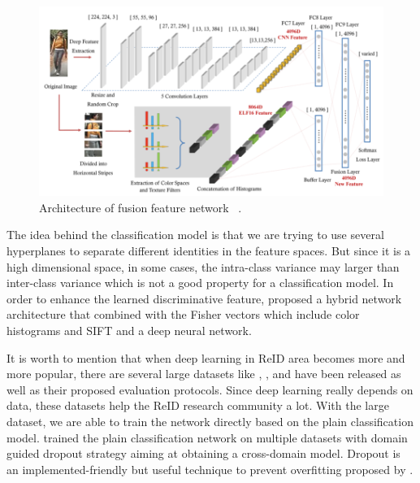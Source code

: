 \begin{figure}
    \includegraphics[width=\linewidth]{figures/ffn.png}
    \caption{Architecture of fusion feature network ~\protect\cite{feature-fusion-net-2016}.}
    \label{fig:ffn}
\end{figure}

The idea behind the classification model is that we are trying to use several hyperplanes
to separate different identities in the feature spaces. But since it is a high dimensional space,
in some cases, the intra-class variance may larger than inter-class variance which is not a good
property for a classification model. In order to enhance the learned discriminative feature,
\cite{hybrid-net-lda-2016} proposed a hybrid network architecture that combined with the Fisher
vectors which include color histograms and SIFT and a deep neural network.

It is worth to mention that when deep learning in ReID area becomes more and more popular,
there are several large datasets like
\cite{dataset-cuhk03-2014}, \cite{dataset-market1501-2015}, \cite{dataset-dukemtmc-2016} and
\cite{dataset-cuhk03-np-2017} have been released as well as their proposed evaluation protocols.
Since deep learning really depends on data, these datasets help the ReID research
community a lot. With the large dataset, we are able to train the network directly based on the
plain classification model. \cite{generic-deep-feature-for-reid-2016} trained the plain classification
network on multiple datasets with domain guided dropout strategy aiming at obtaining a cross-domain
model. Dropout is an implemented-friendly but useful technique  to prevent overfitting proposed
by \cite{dropout-paper-2014}.

